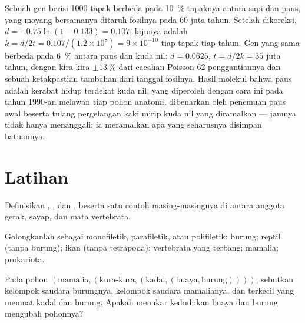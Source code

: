 \begin{example}\label{ex:b2:phylogenetic-trees:dating}
Sebuah gen berisi \num{1000} tapak berbeda pada \qty{10}{\%} tapaknya
antara sapi dan paus, yang moyang bersamanya ditaruh fosilnya pada 60
juta tahun. Setelah dikoreksi, $d = -0.75\ln(1 - 0.133) = 0.107$;
lajunya adalah $k
= d/2t = 0.107/(1.2\times 10^{8}) = 9\times 10^{-10}$ tiap tapak tiap tahun. Gen yang sama berbeda pada \qty{6}{\%} antara
paus dan kuda nil: $d = 0.0625$, $t = d/2k = 35$ juta tahun, dengan
kira-kira $\pm
\qty{13}{\%}$ dari cacahan Poisson 62 penggantiannya dan
sebuah ketakpastian tambahan dari tanggal fosilnya. Hasil molekul bahwa
paus adalah kerabat hidup terdekat kuda nil, yang diperoleh dengan cara
ini pada tahun 1990-an melawan tiap pohon anatomi, dibenarkan oleh
penemuan paus awal beserta tulang pergelangan kaki mirip kuda nil yang
diramalkan --- jamnya tidak hanya menanggali; ia meramalkan apa yang
seharusnya disimpan batuannya.
\end{example}

\section{Latihan}

\begin{exercise}[$\star$]\label{exo:b2:phylogenetic-trees:1}
Definisikan , , dan , beserta satu contoh
masing-masingnya di antara anggota gerak, sayap, dan mata vertebrata.
\end{exercise}

\begin{exercise}[$\star$]\label{exo:b2:phylogenetic-trees:2}
Golongkanlah sebagai monofiletik, parafiletik, atau polifiletik:
burung; reptil (tanpa burung); ikan (tanpa tetrapoda); vertebrata yang
terbang; mamalia; prokariota.
\end{exercise}

\begin{exercise}[$\star$]\label{exo:b2:phylogenetic-trees:3}
Pada pohon $(\text{mamalia},(\text{kura-kura},(\text{kadal},
(\text{buaya},\text{burung}))))$, sebutkan kelompok saudara burungnya,
kelompok saudara mamalianya, dan  terkecil yang memuat kadal dan
burung. Apakah menukar kedudukan buaya dan burung mengubah pohonnya?
\end{exercise}


